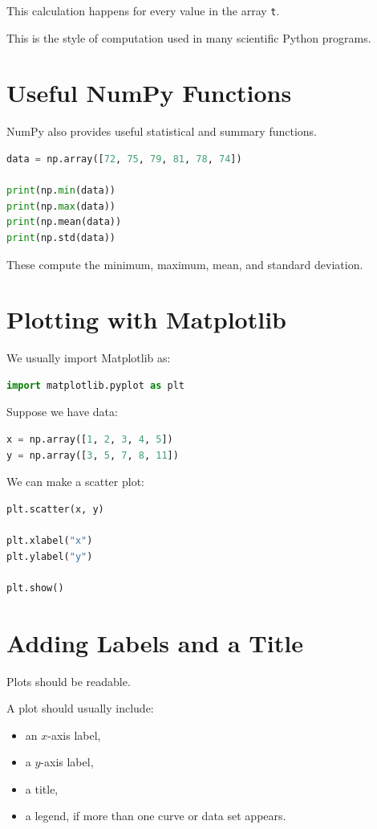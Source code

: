 \documentclass[11pt]{article}
\begin{document}
This calculation happens for every value in the array \texttt{t}.

This is the style of computation used in many scientific Python programs.

\section{Useful NumPy Functions}

NumPy also provides useful statistical and summary functions.

\begin{lstlisting}[language=Python]
data = np.array([72, 75, 79, 81, 78, 74])

print(np.min(data))
print(np.max(data))
print(np.mean(data))
print(np.std(data))
\end{lstlisting}

These compute the minimum, maximum, mean, and standard deviation.

\section{Plotting with Matplotlib}

We usually import Matplotlib as:

\begin{lstlisting}[language=Python]
import matplotlib.pyplot as plt
\end{lstlisting}

Suppose we have data:

\begin{lstlisting}[language=Python]
x = np.array([1, 2, 3, 4, 5])
y = np.array([3, 5, 7, 8, 11])
\end{lstlisting}

We can make a scatter plot:

\begin{lstlisting}[language=Python]
plt.scatter(x, y)

plt.xlabel("x")
plt.ylabel("y")

plt.show()
\end{lstlisting}

\section{Adding Labels and a Title}

Plots should be readable.

A plot should usually include:

\begin{itemize}
    \item an \(x\)-axis label,
    \item a \(y\)-axis label,
    \item a title,
    \item a legend, if more than one curve or data set appears.
\end{itemize}
\end{document}
